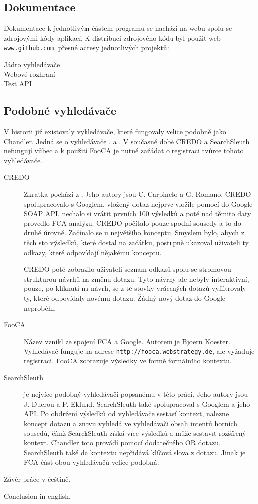 \documentclass[12pt]{article}
\newcommand{\name}{Chandler}
\newcommand{\code}[1]{\texttt{#1}}
\newcommand{\ssection}[1]{\subsection{#1}}
\begin{document}
\ssection{Dokumentace}
Dokumentace k jednotlivým částem programu se nachází na webu spolu se zdrojovými kódy aplikací. K distribuci zdrojového kódu byl použit web \code{www.github.com}, přesné adresy jednotlivých projektů: 

\begin{description}
	\item[Jádro vyhledávače] 
	\item[Webové rozhraní]
	\item[Test API]
\end{description}


\ssection{Podobné vyhledávače}
V historii již existovaly vyhledávače, které fungovaly velice podobně jako \name. Jedná se o vyhledávače ,  a . V současné době CREDO a SearchSleuth nefungují vůbec a k použití FooCA je nutné zažádat o registraci tvůrce tohoto vyhledávače. 

\begin{description}
	\item[CREDO] Zkratka pochází z . Jeho autory jsou C. Carpineto a G. Romano. CREDO spolupracovalo s Googlem, vložený dotaz nejprve vložile pomocí do Google SOAP API, nechalo si vrátit prvních 100 výsledků a poté nad těmito daty provedlo FCA analýzu. CREDO počítalo pouze spodní sousedy a to do druhé úrovně. Začínalo se u největšího konceptu. Smyslem bylo, abych z těch sto výsledků, které dostal na začátku, postupně ukazoval uživateli ty odkazy, které odpovídají nějakému konceptu. 

	CREDO poté zobrazilo uživateli seznam odkazů spolu se stromovou strukturou návrhů na změnu dotazu. Tyto návrhy ale nebyly interaktivní, pouze, po kliknutí na návrh, se z té stovky vrácených dotazů vyfiltrovaly ty, které odpovídaly novému dotazu. Žádný nový dotaz do Google neproběhl. 
	\item[FooCA] Název vznikl ze spojení FCA a Google. Autorem je Bjoern Koester. Vyhledávač funguje na adrese \code{http://fooca.webstrategy.de}, ale vyžaduje registraci. FooCA zobrazuje výsledky ve formě formálního kontextu. 
	\item[SearchSleuth] je nejvíce podobný vyhledávači popsanému v této práci. Jeho autory jsou J. Ducrou a P. Eklund. SearchSleuth také spolupracoval s Googlem a jeho API. Po obdržení výsledků od vyhledávače sestaví kontext, nalezne koncept dotazu a znovu vyhledá ve vyhledávači obsah intentů horních sousedů, čímž SearchSleuth získá více výsledků a může sestavit rozšířený kontext. \name{} toto provádí pomocí dodatečného OR dotazu. SearchSleuth také do kontextu nepřidává klíčová slova z dotazu. Jinak je FCA část obou vyhledávačů velice podobná. 
\end{description}

\begin{conclusions-cz}
  Závěr práce v češtině.
\end{conclusions-cz}


\begin{conclusions-en}
  Conclusion in english.
\end{conclusions-en}
\end{document}
